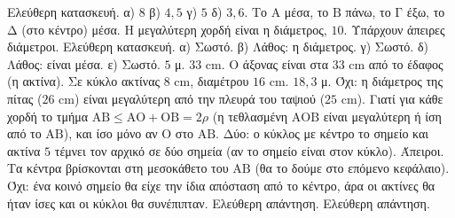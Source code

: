  Ελεύθερη κατασκευή.
 α) $8$ \quad β) $4{,}5$ \quad γ) $5$ \quad δ) $3{,}6$.
 Το $\mathrm{Α}$ μέσα, το $\mathrm{Β}$ πάνω, το $\mathrm{Γ}$ έξω, το $\mathrm{Δ}$ (στο κέντρο) μέσα.
 Η μεγαλύτερη χορδή είναι η διάμετρος, $10$. Υπάρχουν άπειρες διάμετροι.
 Ελεύθερη κατασκευή.
 α) Σωστό. β) Λάθος: η διάμετρος. γ) Σωστό. δ) Λάθος: είναι μέσα. ε) Σωστό.
 $5$ μ.
 $33$ cm. Ο άξονας είναι στα $33$ cm από το έδαφος (η ακτίνα).
 Σε κύκλο ακτίνας $8$ cm, διαμέτρου $16$ cm.
 $18{,}3$ μ.
 Όχι: η διάμετρος της πίτας ($26$ cm) είναι μεγαλύτερη από την πλευρά του ταψιού ($25$ cm).
 Γιατί για κάθε χορδή το τμήμα $\mathrm{ΑΒ}\le\mathrm{ΑΟ}+\mathrm{ΟΒ}=2\rho$ (η τεθλασμένη $\mathrm{ΑΟΒ}$ είναι μεγαλύτερη ή ίση από το $\mathrm{ΑΒ}$), και ίσο μόνο αν $\mathrm{Ο}$ στο $\mathrm{ΑΒ}$.
 Δύο: ο κύκλος με κέντρο το σημείο και ακτίνα $5$ τέμνει τον αρχικό σε δύο σημεία (αν το σημείο είναι στον κύκλο).
 Άπειροι. Τα κέντρα βρίσκονται στη μεσοκάθετο του $\mathrm{ΑΒ}$ (θα το δούμε στο επόμενο κεφάλαιο).
 Όχι: ένα κοινό σημείο θα είχε την ίδια απόσταση από το κέντρο, άρα οι ακτίνες θα ήταν ίσες και οι κύκλοι θα συνέπιπταν.
 Ελεύθερη απάντηση.
 Ελεύθερη απάντηση.
